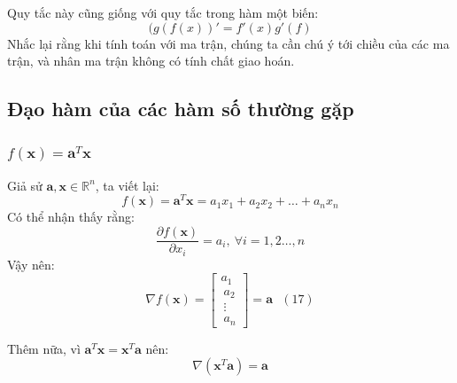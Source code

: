 \documentclass[12pt]{article}
\begin{document}
Quy tắc này cũng giống với quy tắc trong hàm một biến:  
\begin{equation*} 
(g(f(x))' = f'(x)g'(f) 
\end{equation*} 
Nhắc lại rằng khi tính toán với ma trận, chúng ta cần chú ý tới chiều của các ma trận, và nhân ma trận không có tính chất giao hoán.  
 
\subsection{Đạo hàm của các hàm số thường gặp }
 
\subsubsection{$f(\mathbf{x}) = \mathbf{a}^T\mathbf{x}$}
 
Giả sử $\mathbf{a}, \mathbf{x} \in \mathbb{R}^n$, ta viết lại: 
\begin{equation*} 
f(\mathbf{x}) = \mathbf{a}^T\mathbf{x} = a_1 x_1 + a_2 x_2 + \dots + a_nx_n 
\end{equation*} 
Có thể nhận thấy rằng: 
\begin{equation*} 
\frac{\partial f(\mathbf{x})}{\partial x_i} = a_i, ~ \forall i = 1, 2\dots, n 
\end{equation*} 
Vậy nên: 
\begin{equation*} 
\nabla f(\mathbf{x}) =  
\left[ 
\begin{matrix} 
    a_1 \\\ 
    a_2 \\\ 
    \vdots \\\ 
    a_n 
\end{matrix} 
\right] = \mathbf{a} ~~~ (17) 
\end{equation*} 
 
Thêm nữa, vì $\mathbf{a}^T\mathbf{x} = \mathbf{x}^T\mathbf{a}$ nên: 
\begin{equation*} 
\nabla (\mathbf{x}^T\mathbf{a}) = \mathbf{a} 
\end{equation*} 
 
 
\end{document}
